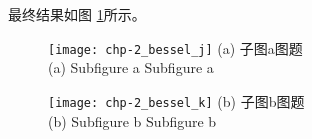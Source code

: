 最终结果如图 \ref{fig-dbfig}所示。
\begin{figure}[htbp!]
\centering
\subfigure{\label{subfigure1}}\addtocounter{subfigure}{-2}
\subfigure{\label{subfigure2}}\addtocounter{subfigure}{-2}
\end{figure}

\begin{figure}[hptb!]
  \centering\small
  \begin{minipage}[t]{0.5\linewidth}
    \centering
    \texttt{[image: chp-2\_bessel\_j]}
    (a) 子图a图题\\[0.3em]
    (a) Subfigure a Subfigure a
  \end{minipage}%
  \begin{minipage}[t]{0.5\textwidth}
    \centering
    \texttt{[image: chp-2\_bessel\_k]}
    (b) 子图b图题\\[0.3em]
    (b) Subfigure b Subfigure b
  \end{minipage}
  \label{fig-dbfig}
 \end{figure}



